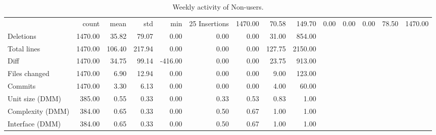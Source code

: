 \begin{table}
\caption{Weekly activity of Non-users.}
\label{tab:weekly_act_nonusers}
\begin{tabular}{lrrrrrrrr}
\toprule
 & count & mean & std & min & 25%
\midrule
Insertions & 1470.00 & 70.58 & 149.70 & 0.00 & 0.00 & 0.00 & 78.50 & 1470.00 \\
Deletions & 1470.00 & 35.82 & 79.07 & 0.00 & 0.00 & 0.00 & 31.00 & 854.00 \\
Total lines & 1470.00 & 106.40 & 217.94 & 0.00 & 0.00 & 0.00 & 127.75 & 2150.00 \\
Diff & 1470.00 & 34.75 & 99.14 & -416.00 & 0.00 & 0.00 & 23.75 & 913.00 \\
Files changed & 1470.00 & 6.90 & 12.94 & 0.00 & 0.00 & 0.00 & 9.00 & 123.00 \\
Commits & 1470.00 & 3.30 & 6.13 & 0.00 & 0.00 & 0.00 & 4.00 & 60.00 \\
Unit size (DMM) & 385.00 & 0.55 & 0.33 & 0.00 & 0.33 & 0.53 & 0.83 & 1.00 \\
Complexity (DMM) & 384.00 & 0.65 & 0.33 & 0.00 & 0.50 & 0.67 & 1.00 & 1.00 \\
Interface (DMM) & 384.00 & 0.65 & 0.33 & 0.00 & 0.50 & 0.67 & 1.00 & 1.00 \\
\bottomrule
\end{tabular}
\end{table}
